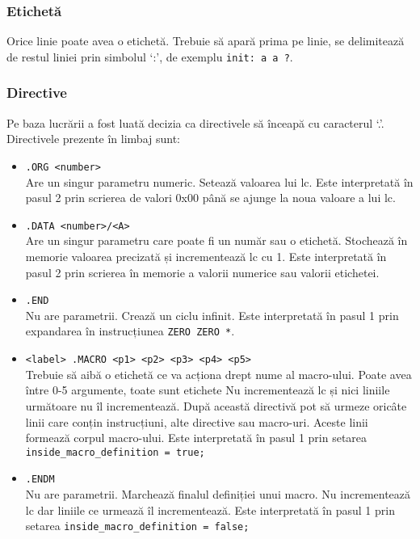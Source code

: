 \documentclass[../main.tex]{subfiles}
\begin{document}
\subsubsection{Etichetă}
Orice linie poate avea o etichetă. Trebuie să apară prima pe linie, se delimitează de restul liniei prin
simbolul `:', de exemplu \texttt{init: a a ?}.

\subsubsection{Directive}
Pe baza lucrării \cite{asl} a fost luată decizia ca directivele să înceapă cu caracterul `.'. Directivele prezente în limbaj sunt:
\begin{itemize}
    \item \verb|.ORG <number>|\\
    Are un singur parametru numeric. Setează valoarea lui \acrshort{lc}. Este interpretată în pasul 2 prin
    scrierea de valori 0x00 până se ajunge la noua valoare a lui \acrshort{lc}.
    \item \verb|.DATA <number>/<A>|\\
    Are un singur parametru care poate fi un număr sau o etichetă. Stochează în memorie valoarea precizată și 
    incrementează \acrshort{lc} cu 1. Este interpretată în pasul 2 prin scrierea în memorie a valorii
    numerice sau valorii etichetei.
    \item \verb|.END|\\
    Nu are parametrii. Crează un ciclu infinit. Este interpretată în pasul 1 prin expandarea în instrucțiunea 
    \texttt{ZERO ZERO *}.
    \item \verb|<label> .MACRO <p1> <p2> <p3> <p4> <p5>|\\
    Trebuie să aibă o etichetă ce va acționa drept nume al macro-ului. Poate avea între 0-5 argumente, toate sunt etichete
    Nu incrementează \acrshort{lc} și nici liniile următoare nu îl incrementează. După această directivă pot să
    urmeze oricâte linii care conțin instrucțiuni, alte directive sau macro-uri. Aceste linii formează corpul
    macro-ului. Este interpretată în pasul 1 prin setarea \allowbreak \texttt{inside\_macro\_definition = true;}
    \item \verb|.ENDM|\\
    Nu are parametrii. Marchează finalul definiției unui macro. Nu incrementează \acrshort{lc} dar liniile ce urmează
    îl incrementează. Este interpretată în pasul 1 prin setarea \allowbreak \texttt{inside\_macro\_definition = false;}
\end{itemize}
\end{document}
